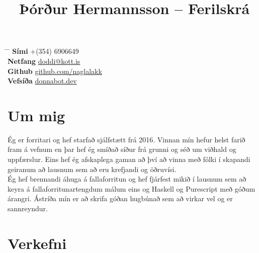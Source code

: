 \documentclass[10pt]{article} %
\begin{document}

\title{Þórður Hermannsson -- Ferilskrá} %


\parbox{0.5\textwidth}{ %
\begin{tabbing} %
\hspace{3cm} \= \hspace{4cm} \= \kill %
{\bf Sími} \> +(354) 6906649 \\ %
{\bf Netfang} \> \href{mailto:doddi@kott.is}{doddi@kott.is} \\ %
{\bf Github} \> \href{https://github.com/naglalakk}{github.com/naglalakk} \\ %
{\bf Vefsíða} \> \href{https://donnabot.dev}{donnabot.dev} \\
\end{tabbing}}


\section{Um mig}

Ég er forritari og hef starfað sjálfstætt frá 2016. Vinnan mín hefur helst farið fram á vefnum en þar hef ég smíðað síður frá grunni og séð um viðhald og uppfærslur. Eins hef ég afskaplega gaman að því að vinna með fólki í skapandi geiranum að lausnum sem að eru krefjandi og öðruvísi.\\
Ég hef brennandi áhuga á fallaforritun og hef fjárfest mikið í lausnum sem að keyra á fallaforritunartengdum málum eins og Haskell og Purescript með góðum árangri. Ástríða mín er að skrifa góðan hugbúnað sem að virkar vel og er sannreyndur.


\section{Verkefni}
\end{document}
